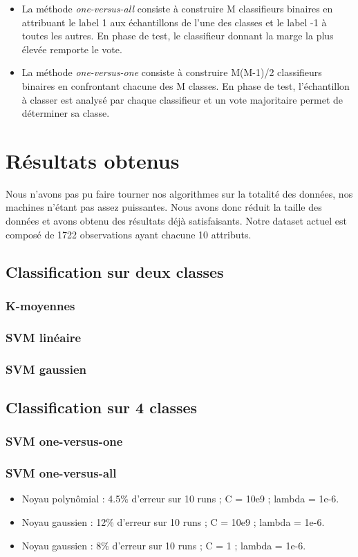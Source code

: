 	\begin{itemize}
	\item La méthode \emph{one-versus-all} consiste à construire M classifieurs binaires en attribuant le label 1 aux échantillons de l'une des classes et le label -1 à toutes les autres. En phase de test, le classifieur donnant la marge la plus élevée remporte le vote.
	\item La méthode \emph{one-versus-one} consiste à construire M(M-1)/2 classifieurs binaires en confrontant chacune des M classes. En phase de test, l'échantillon à classer est analysé par chaque classifieur et un vote majoritaire permet de déterminer sa classe.\\
	\end{itemize}


\section{Résultats obtenus}

Nous n'avons pas pu faire tourner nos algorithmes sur la totalité des données, nos machines n'étant pas assez puissantes. Nous avons donc réduit la taille des données et avons obtenu des résultats déjà satisfaisants. Notre dataset actuel est composé de 1722 observations ayant chacune 10 attributs.

	\subsection{Classification sur deux classes}
		\subsubsection{K-moyennes}
		\subsubsection{SVM linéaire}
		\subsubsection{SVM gaussien}

	\subsection{Classification sur 4 classes}
		\subsubsection{SVM one-versus-one}
		\subsubsection{SVM one-versus-all}
			\begin{itemize}
				\item Noyau polynômial : 4.5\% d'erreur sur 10 runs ; C = 10e9 ; lambda = 1e-6.
				\item Noyau gaussien : 12\% d'erreur sur 10 runs ; C = 10e9 ; lambda = 1e-6.
				\item Noyau gaussien : 8\% d'erreur sur 10 runs ; C = 1 ; lambda = 1e-6.
			\end{itemize}